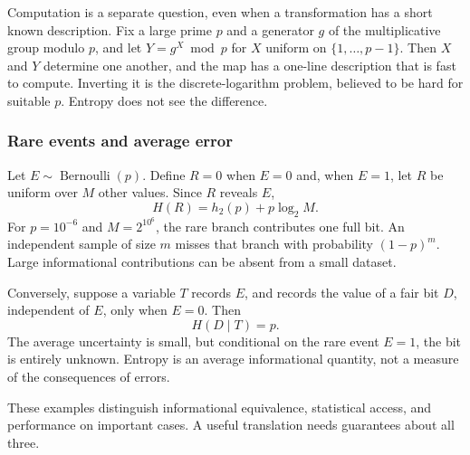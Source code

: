 \documentclass[11pt]{article}
\begin{document}
Computation is a separate question, even when a transformation has a short
known description. Fix a large prime $p$ and a generator $g$ of the
multiplicative group modulo $p$, and let $Y=g^X \bmod p$ for $X$ uniform on
$\{1,\ldots,p-1\}$. Then $X$ and $Y$ determine one another, and the map has a
one-line description that is fast to compute. Inverting it is the
discrete-logarithm problem, believed to be hard for suitable $p$. Entropy does
not see the difference.

\subsubsection{Rare events and average error}
Let $E\sim\operatorname{Bernoulli}(p)$. Define $R=0$ when $E=0$ and, when
$E=1$, let $R$ be uniform over $M$ other values. Since $R$ reveals $E$,
\[
 H(R)=h_2(p)+p\log_2 M.
\]
For $p=10^{-6}$ and $M=2^{10^6}$, the rare branch contributes one full bit.
An independent sample of size $m$ misses that branch with probability
$(1-p)^m$. Large informational contributions can be absent from a small
dataset.

Conversely, suppose a variable $T$ records $E$, and records the value of a fair
bit $D$, independent of $E$, only when $E=0$. Then
\[
 H(D\mid T)=p.
\]
The average uncertainty is small, but conditional on the rare event $E=1$, the
bit is entirely unknown. Entropy is an average informational
quantity, not a measure of the consequences of errors.

These examples distinguish informational equivalence, statistical access, and
performance on important cases. A useful translation needs guarantees about
all three.
\end{document}
